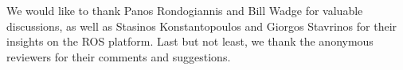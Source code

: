 \documentclass[sigplan,screen,10pt]{acmart}
\begin{document}
\begin{acks}
We would like to thank Panos Rondogiannis and Bill Wadge for valuable discussions,
as well as Stasinos Konstantopoulos and Giorgos Stavrinos for their insights on the ROS platform.
Last but not least, we thank the anonymous reviewers for their comments and suggestions.
\end{acks}



\end{document}
